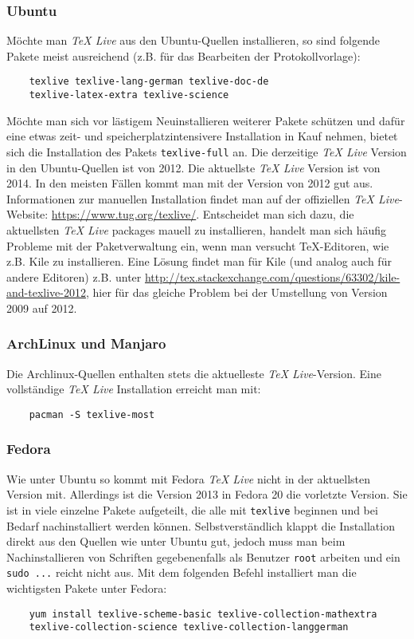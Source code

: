 \subsubsection{Ubuntu}
Möchte man \textit{TeX Live} aus den Ubuntu-Quellen installieren, so sind folgende Pakete meist ausreichend (z.B. für das Bearbeiten der Protokollvorlage):
\begin{verbatim}
	texlive texlive-lang-german texlive-doc-de
	texlive-latex-extra texlive-science
\end{verbatim}
Möchte man sich vor lästigem Neuinstallieren weiterer Pakete schützen und dafür eine etwas zeit- und speicherplatzintensivere Installation in Kauf nehmen, bietet sich die Installation des Pakets \verb|texlive-full| an. Die derzeitige \textit{TeX Live} Version in den Ubuntu-Quellen ist von 2012. Die aktuellste \textit{TeX Live} Version ist von 2014. In den meisten Fällen kommt man mit der Version von 2012 gut aus. Informationen zur manuellen Installation findet man auf der offiziellen \textit{TeX Live}-Website: \url{https://www.tug.org/texlive/}. Entscheidet man sich dazu, die aktuellsten \textit{TeX Live} packages mauell zu installieren, handelt man sich häufig Probleme mit der Paketverwaltung ein, wenn man versucht TeX-Editoren, wie z.B. Kile zu installieren. Eine Lösung findet man für Kile (und analog auch für andere Editoren) z.B. unter \url{http://tex.stackexchange.com/questions/63302/kile-and-texlive-2012}, hier für das gleiche Problem bei der Umstellung von Version 2009 auf 2012.

\subsubsection{ArchLinux und Manjaro}
Die Archlinux-Quellen enthalten stets die aktuelleste \textit{TeX Live}-Version. Eine vollständige \textit{TeX Live} Installation erreicht man mit:
\begin{verbatim}
	pacman -S texlive-most
\end{verbatim}

\subsubsection{Fedora}
Wie unter Ubuntu so kommt mit Fedora \textit{TeX Live} nicht in der aktuellsten Version mit.
Allerdings ist die Version 2013 in Fedora 20 die vorletzte Version.
Sie ist in viele einzelne Pakete aufgeteilt, die alle mit \verb|texlive| beginnen und bei Bedarf nachinstalliert werden können.
Selbstverständlich klappt die Installation direkt aus den Quellen wie unter Ubuntu gut, jedoch muss man beim Nachinstallieren von Schriften gegebenenfalls als Benutzer \verb|root| arbeiten und ein \verb|sudo ...| reicht nicht aus.
Mit dem folgenden Befehl installiert man die wichtigsten Pakete unter Fedora:
\begin{verbatim}
	yum install texlive-scheme-basic texlive-collection-mathextra
	texlive-collection-science texlive-collection-langgerman 
\end{verbatim}

